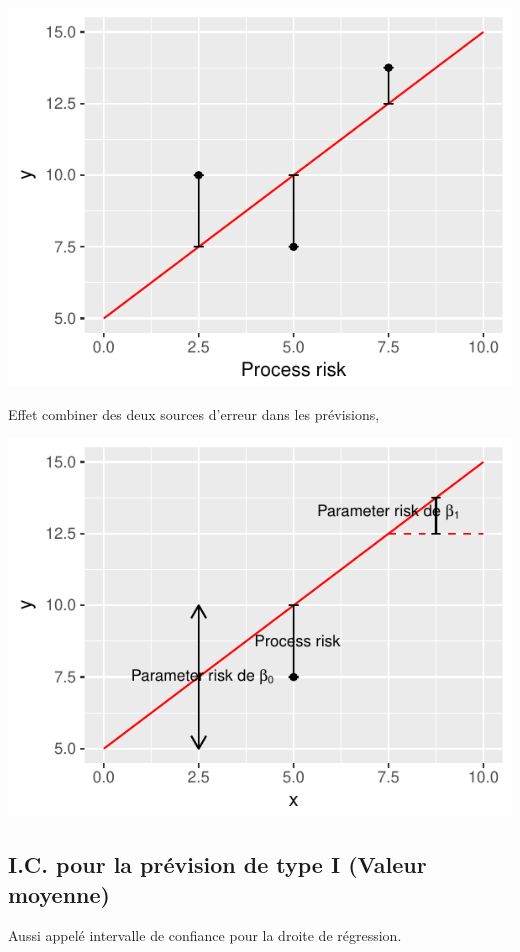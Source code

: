 \documentclass[11pt,french]{report}
\begin{document}
\begin{enumerate}
\begin{itemize}
\includegraphics{notes_de_cours-019}
\end{itemize}
\end{enumerate}

Effet combiner des deux sources d'erreur dans les prévisions,

\includegraphics{notes_de_cours-020}

\subsection{I.C. pour la prévision de type I (Valeur moyenne)}
\label{sec:type1}
Aussi appelé intervalle de confiance pour la droite de régression.
\bigskip
\end{document}
